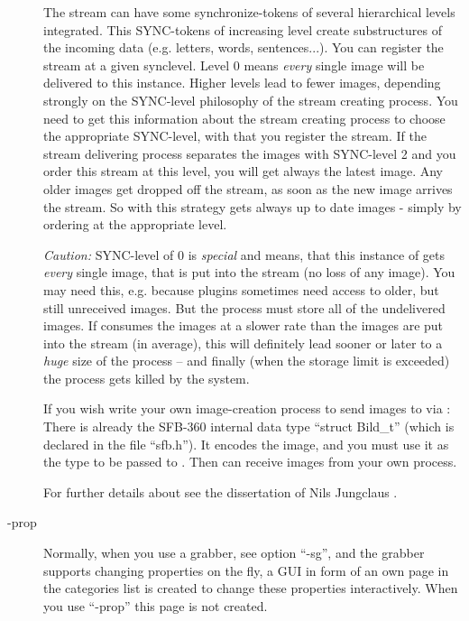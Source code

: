 \begin{description}
  The stream can have some synchronize-tokens of several hierarchical
  levels integrated. This SYNC-tokens of increasing level create
  substructures of the incoming data (e.g. letters, words,
  sentences...). You can register the stream at a given
  synclevel. Level 0 means {\em every} single image will be
  delivered to this \icewing{} instance. Higher levels lead to fewer
  images, depending strongly on the SYNC-level philosophy of the
  stream creating process. You need to get this information about
  the stream creating process to choose the appropriate SYNC-level,
  with that you register the \dacs{} stream. If the stream
  delivering process separates the images with SYNC-level 2 and you
  order this stream at this level, you will get always the latest
  image. Any older images get dropped off the stream, as soon as the
  new image arrives the stream. So with this strategy \icewing{}
  gets always up to date images - simply by ordering at the
  appropriate level.

  {\em Caution:} SYNC-level of 0 is {\em special} and means, that
  this instance of \icewing{} gets {\em every} single image, that is
  put into the stream (no loss of any image). You may need this,
  e.g. because plugins sometimes need access to older, but still
  unreceived images. But the \dacs{} process must store all of the
  undelivered images. If \icewing{} consumes the images at a slower
  rate than the images are put into the stream (in average), this
  will definitely lead sooner or later to a {\em huge} size of the
  \dacs{} process -- and finally (when the storage limit is
  exceeded) the process gets killed by the system.

  If you wish write your own image-creation process to send images
  to \icewing{} via \dacs{}: There is already the SFB-360 internal
  data type ``struct Bild\_t'' (which is declared in the file
  ``sfb.h''). It encodes the image, and you must use it as the type
  to be passed to \dacs{}. Then \icewing{} can receive images from
  your own process.

  For further details about \dacs{} see the dissertation of Nils
  Jungclaus \cite{Jungclaus1998-IVS}.

\item[-prop]
  Normally, when you use a grabber, see option ``-sg'', and the
  grabber supports changing properties on the fly, a GUI in form of
  an own page in the categories list is created to change these
  properties interactively. When you use ``-prop'' this page is not
  created.


\end{description}
